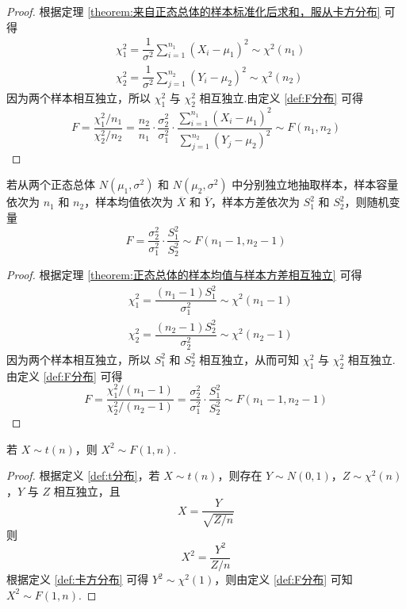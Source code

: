 \begin{proof}
    根据定理 \ref{theorem:来自正态总体的样本标准化后求和，服从卡方分布} 可得
    $$
    \begin{aligned}
        & \chi_1^2 = \dfrac{1}{\sigma^2} \sum_{i=1}^{n_1} (X_i - \mu_1)^2 \sim \chi^2(n_1) \\
        & \chi_2^2 = \dfrac{1}{\sigma^2} \sum_{j=1}^{n_2} (Y_i - \mu_2)^2 \sim \chi^2(n_2)
    \end{aligned}
    $$
    因为两个样本相互独立，所以 $\chi_1^2$ 与 $\chi_2^2$ 相互独立.由定义 \ref{def:F分布} 可得
    $$
    F = \dfrac{\chi_1^2 / n_1}{\chi_2^2 / n_2} = \dfrac{n_2}{n_1} \cdot \dfrac{\sigma_2^2}{\sigma_1^2} \cdot \dfrac{\displaystyle\sum_{i=1}^{n_1} (X_i - \mu_1)^2}{\displaystyle\sum_{j=1}^{n_2} (Y_j - \mu_2)^2} \sim F(n_1, n_2)
    $$
\end{proof}

\begin{theorem}
    若从两个正态总体 $N(\mu_1, \sigma^2)$ 和 $N(\mu_2, \sigma^2)$ 中分别独立地抽取样本，样本容量依次为 $n_1$ 和 $n_2$，样本均值依次为 $\overline{X}$ 和 $\overline{Y}$，样本方差依次为 $S_1^2$ 和 $S_2^2$，则随机变量
    $$
    F = \dfrac{\sigma_2^2}{\sigma_1^2} \cdot \dfrac{S_1^2}{S_2^2} \sim F(n_1 - 1, n_2 - 1)
    $$
\end{theorem}

\begin{proof}
    根据定理 \ref{theorem:正态总体的样本均值与样本方差相互独立} 可得
    $$
    \begin{aligned}
        & \chi_1^2 = \dfrac{(n_1 - 1) S_1^2}{\sigma_1^2} \sim \chi^2(n_1 - 1) \\
        & \chi_2^2 = \dfrac{(n_2 - 1) S_2^2}{\sigma_2^2} \sim \chi^2(n_2 - 1)
    \end{aligned}
    $$
    因为两个样本相互独立，所以 $S_1^2$ 和 $S_2^2$ 相互独立，从而可知 $\chi_1^2$ 与 $\chi_2^2$ 相互独立.由定义 \ref{def:F分布} 可得
    $$
    F = \dfrac{\chi_1^2 / (n_1 - 1)}{\chi_2^2 / (n_2 - 1)} = \dfrac{\sigma_2^2}{\sigma_1^2} \cdot \dfrac{S_1^2}{S_2^2} \sim F(n_1 - 1, n_2 - 1)
    $$
\end{proof}

\begin{conclusion}
    若 $X \sim t(n)$，则 $X^2 \sim F(1,n)$.
\end{conclusion}

\begin{proof}
    根据定义 \ref{def:t分布}，若 $X \sim t(n)$，则存在 $Y \sim N(0,1)$，$Z \sim \chi^2(n)$，$Y$ 与 $Z$ 相互独立，且
    $$
    X = \dfrac{Y}{\sqrt{Z / n}}
    $$
    则
    $$
    X^2 = \dfrac{Y^2}{Z / n}
    $$
    根据定义 \ref{def:卡方分布} 可得 $Y^2 \sim \chi^2(1)$，则由定义 \ref{def:F分布} 可知 $X^2 \sim F(1,n)$.
\end{proof}